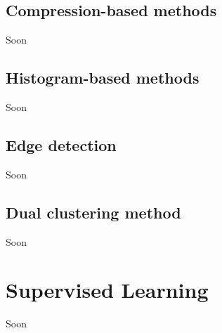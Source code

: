\vspace{-0.3cm}

\subsection{Compression-based methods}\label{sec:3.3.3}
\vspace{-0.5cm}
\noindent  Soon

\vspace{-0.3cm}

\subsection{Histogram-based methods}\label{sec:3.3.4}
\vspace{-0.5cm}
\noindent  Soon

\vspace{-0.3cm}

\subsection{Edge detection}\label{sec:3.3.5}
\vspace{-0.5cm}
\noindent Soon


\vspace{-0.3cm}

\subsection{Dual clustering method}\label{sec:3.3.6}
\vspace{-0.5cm}
\noindent Soon

\vspace{-0.3cm}




\section{Supervised Learning}\label{sec:3.4}
\vspace{-0.5cm}
\noindent Soon

